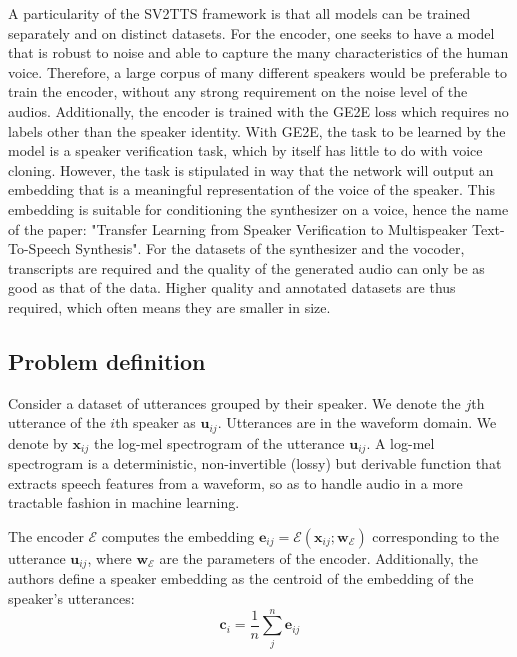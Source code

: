 \documentclass[a4paper, oneside, 12pt, english]{article}
\begin{document}
A particularity of the SV2TTS framework is that all models can be trained separately and on distinct datasets. For the encoder, one seeks to have a model that is robust to noise and able to capture the many characteristics of the human voice. Therefore, a large corpus of many different speakers would be preferable to train the encoder, without any strong requirement on the noise level of the audios. Additionally, the encoder is trained with the GE2E loss which requires no labels other than the speaker identity. With GE2E, the task to be learned by the model is a speaker verification task, which by itself has little to do with voice cloning. However, the task is stipulated in way that the network will output an embedding that is a meaningful representation of the voice of the speaker. This embedding is suitable for conditioning the synthesizer on a voice, hence the name of the paper: "Transfer Learning from Speaker Verification to Multispeaker Text-To-Speech Synthesis". For the datasets of the synthesizer and the vocoder, transcripts are required and the quality of the generated audio can only be as good as that of the data. Higher quality and annotated datasets are thus required, which often means they are smaller in size.



\subsection{Problem definition} \label{problem_definition}
\newcommand{\vx}{\mathbf{x}}
\newcommand{\vu}{\mathbf{u}}
\newcommand{\ve}{\mathbf{e}}
\newcommand{\vt}{\mathbf{t}}
\newcommand{\vc}{\mathbf{c}}
\newcommand{\vw}{\mathbf{w}}
\newcommand{\ms}{\mathbf{S}}
\newcommand{\enc}{\mathcal{E}}
\newcommand{\syn}{\mathcal{S}}
\newcommand{\voc}{\mathcal{V}}
Consider a dataset of utterances grouped by their speaker. We denote the $j$th utterance of the $i$th speaker as $\vu_{ij}$. Utterances are in the waveform domain. We denote by $\vx_{ij}$ the log-mel spectrogram of the utterance $\vu_{ij}$. A log-mel spectrogram is a deterministic, non-invertible (lossy) but derivable function that extracts speech features from a waveform, so as to handle audio in a more tractable fashion in machine learning.

The encoder $\enc$ computes the embedding $\ve_{ij} = \enc(\vx_{ij}; \vw_\enc)$ corresponding to the utterance $\vu_{ij}$, where $\vw_\enc$ are the parameters of the encoder. Additionally, the authors define a speaker embedding as the centroid of the embedding of the speaker's utterances:
\begin{equation}\label{speaker_embedding}
\vc_i=\frac{1}{n}\sum_{j}^{n}\ve_{ij}
\end{equation}
\end{document}

